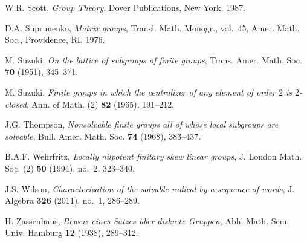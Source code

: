\documentclass[11pt, reqno]{amsart}
\numberwithin{equation}{section}
\theoremstyle{definition}
\numberwithin{equation}{section}
\begin{document}
\begin{thebibliography}{}
 W.R. Scott, \emph{Group Theory}, Dover Publications, New York, 1987.

 D.A. Suprunenko, \emph{Matrix groups}, Transl. Math. Monogr., vol.~45, Amer. Math. Soc., Providence, RI, 1976.

 M. Suzuki, \emph{On the lattice of subgroups of finite groups}, Trans. Amer. Math. Soc. \textbf{70} (1951), 345--371.

 M. Suzuki, \emph{Finite groups in which the centralizer of any element of order $2$ is $2$-closed}, Ann. of Math. (2) \textbf{82} (1965), 191--212.

 J.G. Thompson, \emph{Nonsolvable finite groups all of whose local subgroups are solvable}, Bull. Amer. Math. Soc. \textbf{74} (1968), 383--437.

 B.A.F. Wehrfritz, \emph{Locally nilpotent finitary skew linear groups}, J. London Math. Soc. (2) \textbf{50} (1994), no.~2, 323--340.

 J.S. Wilson, \emph{Characterization of the solvable radical by a sequence of words}, J. Algebra \textbf{326} (2011), no.~1, 286--289.

 H. Zassenhaus, \emph{Beweis eines Satzes \"{u}ber diskrete Gruppen}, Abh. Math. Sem. Univ. Hamburg \textbf{12} (1938), 289--312.

\end{thebibliography}
\end{document}
